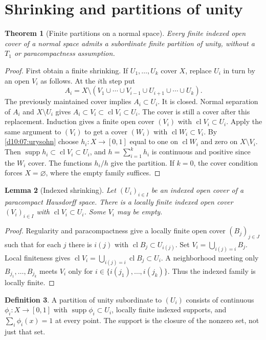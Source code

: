 \documentclass[11pt,oneside,openany]{book}
\newtheorem{theorem}{Theorem}[chapter]
\newtheorem{lemma}[theorem]{Lemma}
\theoremstyle{definition}
\newtheorem{definition}[theorem]{Definition}
\theoremstyle{remark}
\DeclareMathOperator{\cl}{cl}
\DeclareMathOperator{\supp}{supp}
\begin{document}
\section{Shrinking and partitions of unity}
\begin{theorem}[Finite partitions on a normal space]\label{d10:15:finite-partition}
Every finite indexed open cover of a normal space admits a subordinate
finite partition of unity, without a $T_1$ or paracompactness assumption.
\end{theorem}
\begin{proof}
First obtain a finite shrinking. If $U_1,\ldots,U_k$ cover $X$, replace
$U_i$ in turn by an open $V_i$ as follows. At the $i$th step put
\[
 A_i=X\setminus(V_1\cup\cdots\cup V_{i-1}\cup U_{i+1}\cup\cdots\cup U_k).
\]
The previously maintained cover implies $A_i\subset U_i$.
It is closed. Normal separation of $A_i$ and $X\setminus U_i$ gives
$A_i\subset V_i\subset\cl V_i\subset U_i$. The cover is still a
cover after this replacement. Induction gives a finite open cover
$(V_i)$ with $\cl V_i\subset U_i$. Apply the same argument to $(V_i)$
to get a cover $(W_i)$ with $\cl W_i\subset V_i$.
By \cref{d10:07:urysohn} choose $h_i:X\to[0,1]$ equal to one on
$\cl W_i$ and zero on $X\setminus V_i$. Then
$\supp h_i\subset\cl V_i\subset U_i$, and $h=\sum_{i=1}^k h_i$
is continuous and positive since the $W_i$ cover.
The functions $h_i/h$ give the partition. If $k=0$, the cover
condition forces $X=\varnothing$, where the empty family suffices.
\end{proof}

\begin{lemma}[Indexed shrinking]\label{d10:15:shrinking}
Let $(U_i)_{i\in I}$ be an indexed open cover of a paracompact Hausdorff space. There is a
locally finite indexed open cover $(V_i)_{i\in I}$ with $\cl V_i\subset U_i$.
Some $V_i$ may be empty.
\end{lemma}
\begin{proof}
Regularity and paracompactness give a locally finite open cover
$(B_j)_{j\in J}$ such that for each $j$ there is $i(j)$ with
$\cl B_j\subset U_{i(j)}$. Set $V_i=\bigcup_{i(j)=i}B_j$.
Local finiteness gives
$\cl V_i=\bigcup_{i(j)=i}\cl B_j\subset U_i$.
A neighborhood meeting only $B_{j_1},\ldots,B_{j_k}$ meets $V_i$
only for $i\in\{i(j_1),\ldots,i(j_k)\}$. Thus the indexed family is locally finite.
\end{proof}

\begin{definition}\label{d10:15:partition-definition}
A partition of unity subordinate to $(U_i)$ consists of continuous
$\phi_i:X\to[0,1]$ with $\supp\phi_i\subset U_i$, locally finite indexed
supports, and $\sum_i\phi_i(x)=1$ at every point. The support is the closure
of the nonzero set, not just that set.
\end{definition}
\end{document}
